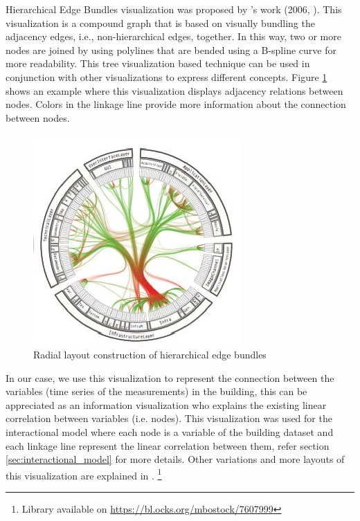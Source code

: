 Hierarchical Edge Bundles visualization was proposed by \citeauthor{holten2006hierarchical}'s work (2006, \cite{holten2006hierarchical}). This visualization is a compound graph that is based on visually bundling the adjacency edges, i.e., non-hierarchical edges, together. In this way, two or more nodes are joined by using polylines that are bended using a B-spline curve for more readability. This tree visualization based technique can be used in conjunction with other visualizations to express different concepts. Figure \ref{fig:edge} shows an example where this visualization displays adjacency relations between nodes. Colors in the linkage line provide more information about the connection between nodes. 



\begin{figure}[h!]
  \vspace{0.5em} %
  \includegraphics[scale=0.7]{Figures/edge.jpg}
  \caption[description]{Radial layout construction of hierarchical edge bundles}
  \label{fig:edge}
\end{figure}


In our case, we use this visualization to represent the connection between the variables (time series of the measurements) in the building, this can be appreciated as an information visualization who explains the existing linear correlation between variables (i.e. nodes). This visualization was used for the interactional model where each node is a variable of the building dataset and each linkage line represent the linear correlation between them, refer section \ref{sec:interactional_model} for more details. Other variations and more layouts of this visualization are explained in \cite{holten2006hierarchical}. \footnote{Library available on \url{https://bl.ocks.org/mbostock/7607999}}

  